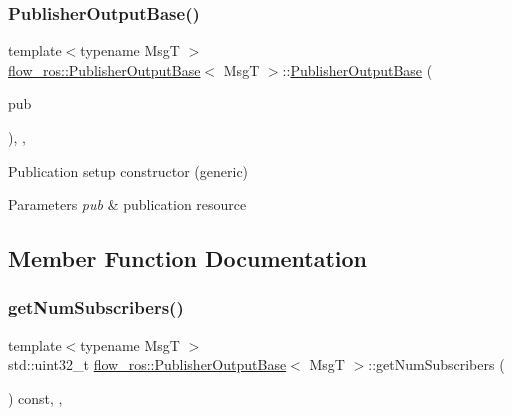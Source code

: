 \subsubsection{\texorpdfstring{Publisher\+Output\+Base()}{PublisherOutputBase()}}
{\footnotesize\ttfamily template$<$typename MsgT $>$ \\
\hyperlink{classflow__ros_1_1_publisher_output_base}{flow\+\_\+ros\+::\+Publisher\+Output\+Base}$<$ MsgT $>$\+::\hyperlink{classflow__ros_1_1_publisher_output_base}{Publisher\+Output\+Base} (\begin{DoxyParamCaption}\item[{std\+::shared\+\_\+ptr$<$ \hyperlink{classflow__ros_1_1routing_1_1_publication_wrapper}{routing\+::\+Publication\+Wrapper}$<$ MsgT $>$$>$}]{pub }\end{DoxyParamCaption})\hspace{0.3cm}{\ttfamily [inline]}, {\ttfamily [explicit]}, {\ttfamily [protected]}}



Publication setup constructor (generic) 


\begin{DoxyParams}{Parameters}
{\em pub} & publication resource \\
\hline
\end{DoxyParams}


\subsection{Member Function Documentation}
\mbox{\label{classflow__ros_1_1_publisher_output_base_a8f51f3d329d65aad7d0f9ea6b4f3c4b6}} 
\subsubsection{\texorpdfstring{get\+Num\+Subscribers()}{getNumSubscribers()}}
{\footnotesize\ttfamily template$<$typename MsgT $>$ \\
std\+::uint32\+\_\+t \hyperlink{classflow__ros_1_1_publisher_output_base}{flow\+\_\+ros\+::\+Publisher\+Output\+Base}$<$ MsgT $>$\+::get\+Num\+Subscribers (\begin{DoxyParamCaption}{ }\end{DoxyParamCaption}) const\hspace{0.3cm}{\ttfamily [inline]}, {\ttfamily [final]}, {\ttfamily [virtual]}}



